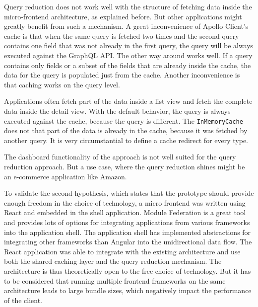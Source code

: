 \bigskip

\noindent Query reduction does not work well with the structure of fetching data inside the micro-frontend architecture, as explained before. But other applications might greatly benefit from such a mechanism. A great inconvenience of Apollo Client's cache is that when the same query is fetched two times and the second query contains one field that was not already in the first query, the query will be always executed against the GraphQL \ac{API}. The other way around works well. If a query contains only fields or a subset of the fields that are already inside the cache, the data for the query is populated just from the cache. Another inconvenience is that caching works on the query level. 

Applications often fetch part of the data inside a list view and fetch the complete data inside the detail view. With the default behavior, the query is always executed against the cache, because the query is different. The \texttt{InMemoryCache}  does not that part of the data is already in the cache, because it was fetched by another query. It is very circumstantial to define a cache redirect for every type.

The dashboard functionality of the approach is not well suited for the query reduction approach. But a use case, where the query reduction shines might be an e-commerce application like Amazon.

\bigskip

\noindent To validate the second hypothesis, which states that the prototype should provide enough freedom in the choice of technology, a micro frontend was written using React and embedded in the shell application. Module Federation is a great tool and provides lots of options for integrating applications from various frameworks into the application shell. The application shell has implemented abstractions for integrating other frameworks than Angular into the unidirectional data flow. The React application was able to integrate with the existing architecture and use both the shared caching layer and the query reduction mechanism. The architecture is thus theoretically open to the free choice of technology. But it has to be considered that running multiple frontend frameworks on the same architecture leads to large bundle sizes, which negatively impact the performance of the client.
